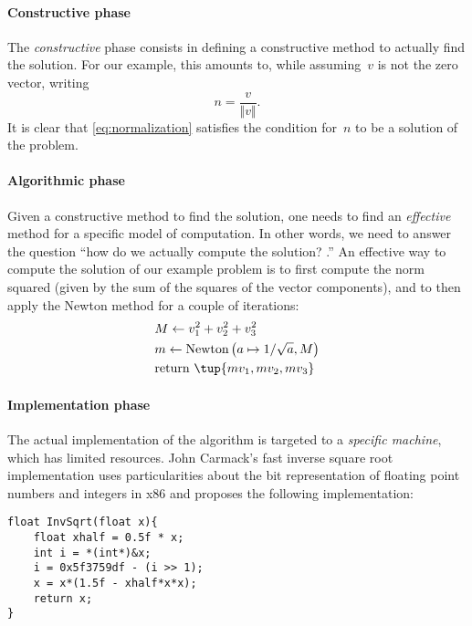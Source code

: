\paragraph*{Constructive phase}
The \emph{constructive} phase consists in defining a constructive method to actually find the solution.
For our example, this amounts to, while assuming~$v$ is not the zero vector, writing
\begin{equation}
    \label{eq:normalization}
    n=\frac{v}{\Vert v \Vert}.
\end{equation}
It is clear that \cref{eq:normalization} satisfies the condition for~$n$ to be a solution of the problem.
\paragraph*{Algorithmic phase}
Given a constructive method to find the solution, one needs to find an \emph{effective} method for a specific model of computation.
In other words, we need to answer the question ``how do we actually compute the solution?
.''
An effective way to compute the solution of our example problem is to first compute the norm squared (given by the sum of the squares of the vector components), and to then apply the Newton method for a couple of iterations:
\begin{equation}
    \label{eq:newton_normalization}
    \begin{aligned}
         & M\leftarrow v_1^2+v_2^2+v_3^2                               \\
         & m\leftarrow \text{Newton}\left(a\mapsto 1/\sqrt{a},M\right) \\
         & \text{return }\tup{mv_1,mv_2,mv_3}
    \end{aligned}
\end{equation}
%

\paragraph*{Implementation phase}
The actual implementation of the algorithm is targeted to a \emph{specific machine}, which has limited resources.
John Carmack's fast inverse square root implementation uses particularities about the bit representation of floating point numbers and integers in x86 and proposes the following implementation:

\begin{center}
    \begin{verbatim}
float InvSqrt(float x){
    float xhalf = 0.5f * x;
    int i = *(int*)&x;
    i = 0x5f3759df - (i >> 1);
    x = x*(1.5f - xhalf*x*x);
    return x;
}
    \end{verbatim}
\end{center}


